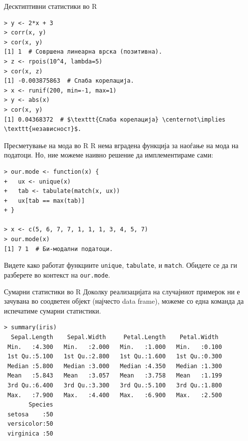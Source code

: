 \documentclass[hyperref={unicode}, xcolor={svgnames, table},
usepdftitle=false]{beamer}
\theoremstyle{remark}
\begin{document}
\begin{frame}[fragile]{Десктиптивни статистики во R}
\begin{verbatim}
> y <- 2*x + 3
> corr(x, y)
> cor(x, y)
[1] 1  # Совршена линеарна врска (позитивна).
> z <- rpois(10^4, lambda=5)
> cor(x, z)
[1] -0.003875863  # Слаба корелација.
> x <- runif(200, min=-1, max=1)
> y <- abs(x)
> cor(x, y)
[1] 0.04368372  # $\texttt{Слаба корелација} \centernot\implies \texttt{независност}$.
\end{verbatim}
\end{frame}

\begin{frame}[fragile]{Пресметување на мода во R}
  R нема вградена функција за наоѓање на мода на податоци.  Но, ние можеме
  наивно решение да имплементираме сами:
\begin{verbatim}
> our.mode <- function(x) {
+   ux <- unique(x)
+   tab <- tabulate(match(x, ux))
+   ux[tab == max(tab)]
+ }

> x <- c(5, 6, 7, 7, 1, 1, 1, 3, 4, 5, 7)
> our.mode(x)
[1] 7 1  # Би-модални податоци.
\end{verbatim}

  Видете како работат функциите \texttt{unique},
  \texttt{tabulate}, и \texttt{match}.  Обидете се да ги разберете
  во контекст на \texttt{our.mode}.
\end{frame}

\begin{frame}[fragile]{Сумарни статистики во R}
  Доколку реализацијата на случајниот примерок ни е зачувана во соодветен објект
  (најчесто data frame), можеме со една команда да испечатиме сумарни
  статистики.
\begin{verbatim}
> summary(iris)
  Sepal.Length    Sepal.Width     Petal.Length    Petal.Width
 Min.   :4.300   Min.   :2.000   Min.   :1.000   Min.   :0.100
 1st Qu.:5.100   1st Qu.:2.800   1st Qu.:1.600   1st Qu.:0.300
 Median :5.800   Median :3.000   Median :4.350   Median :1.300
 Mean   :5.843   Mean   :3.057   Mean   :3.758   Mean   :1.199
 3rd Qu.:6.400   3rd Qu.:3.300   3rd Qu.:5.100   3rd Qu.:1.800
 Max.   :7.900   Max.   :4.400   Max.   :6.900   Max.   :2.500
       Species
 setosa    :50
 versicolor:50
 virginica :50
\end{verbatim}
\end{frame}
\end{document}
